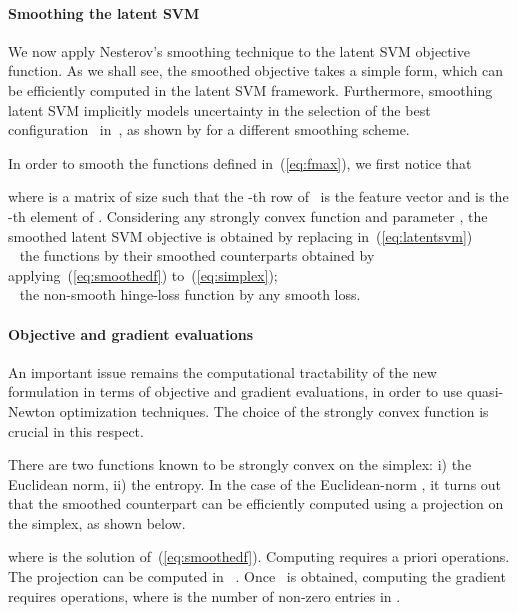 \documentclass{article}
\begin{document}
\paragraph{Smoothing the latent SVM}
We now apply Nesterov's smoothing technique to the latent SVM objective
function. As we shall see, the smoothed objective takes a simple form, which can
be efficiently computed in the latent SVM framework.  Furthermore, smoothing
latent SVM implicitly models uncertainty in the selection of the best
configuration~ in~, as shown by \citet{KumarPK12} for 
a different smoothing scheme. 

In order to smooth the functions  defined in~(\ref{eq:fmax}), 
we first notice that

where  is a matrix of size  such that the -th row of~ is
the feature vector  and  is the -th element of .
Considering any strongly convex function  and parameter , 
the smoothed latent SVM objective is obtained by replacing in~(\ref{eq:latentsvm}) \\
~ the functions  by their smoothed counterparts  obtained by applying~(\ref{eq:smoothedf}) to~(\ref{eq:simplex}); \\
~ the non-smooth hinge-loss function  by any smooth loss. 












\paragraph{Objective and gradient evaluations}
An important issue remains the computational tractability of the new
formulation in terms of objective and gradient evaluations, in order to
use quasi-Newton optimization techniques. The choice of the strongly convex
function  is crucial in this respect. 

There are two functions known to be strongly convex on the simplex: i) the
Euclidean norm, ii) the entropy.  In the case of the Euclidean-norm
, it turns out that the
smoothed counterpart can be efficiently computed using a projection on
the simplex, as shown below.

where  is the solution of~(\ref{eq:smoothedf}).  Computing
 requires a priori  operations.  The projection can be computed
in ~\citep[see, e.g.,][]{MAL-015}.  Once~ is obtained,
computing the gradient requires  operations, where
 is the number of non-zero entries in .
\end{document}
